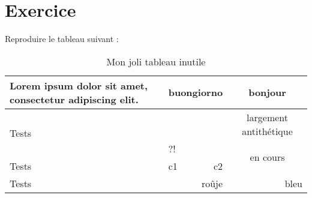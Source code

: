 \documentclass[a4paper, 11pt]{article}
\begin{document}
    \section{Exercice}

    Reproduire le tableau suivant :

        \begin{table}[h]
        \centering
            \begin{tabular}{|p{3cm} c|r|c|}
                \hline
                Lorem ipsum dolor sit amet, consectetur adipiscing elit. & \multicolumn{2}{c|}{buongiorno} & bonjour \\
                \hline\hline
                \multirow{2}{*}{Tests} & \multicolumn{2}{c}{} & largement antithétique \\
                \cline{2-4}
                & \multicolumn{2}{|l}{?!} & \multirow{2}{*}{en cours} \\
                \cline{1-3}
                Tests & \multicolumn{1}{|l|}{c1} & c2 & \\
                \hline
                Tests & \multicolumn{2}{||r|}{roûje} & \multicolumn{1}{r|}{bleu} \\
                \hline

            \end{tabular}
        \caption{Mon joli tableau inutile}
        \end{table}
\end{document}
